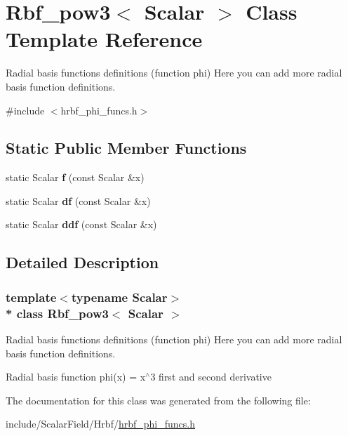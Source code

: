 \hypertarget{structRbf__pow3}{}\section{Rbf\+\_\+pow3$<$ Scalar $>$ Class Template Reference}
\label{structRbf__pow3}


Radial basis functions definitions (function phi) Here you can add more radial basis function definitions.  




{\ttfamily \#include $<$hrbf\+\_\+phi\+\_\+funcs.\+h$>$}

\subsection*{Static Public Member Functions}
\begin{DoxyCompactItemize}
\item 
static Scalar {\bfseries f} (const Scalar \&x)\hypertarget{structRbf__pow3_afcb103387ea85d1efd1b17323896a79e}{}\label{structRbf__pow3_afcb103387ea85d1efd1b17323896a79e}

\item 
static Scalar {\bfseries df} (const Scalar \&x)\hypertarget{structRbf__pow3_a80918c29fab5d70f25f460922af3ef44}{}\label{structRbf__pow3_a80918c29fab5d70f25f460922af3ef44}

\item 
static Scalar {\bfseries ddf} (const Scalar \&x)\hypertarget{structRbf__pow3_af190ed5fb53b24864ddfdafda0ed0217}{}\label{structRbf__pow3_af190ed5fb53b24864ddfdafda0ed0217}

\end{DoxyCompactItemize}


\subsection{Detailed Description}
\subsubsection*{template$<$typename Scalar$>$\\*
class Rbf\+\_\+pow3$<$ Scalar $>$}

Radial basis functions definitions (function phi) Here you can add more radial basis function definitions. 

Radial basis function phi(x) = x$^\wedge$3 first and second derivative 

The documentation for this class was generated from the following file\+:\begin{DoxyCompactItemize}
\item 
include/\+Scalar\+Field/\+Hrbf/\hyperlink{hrbf__phi__funcs_8h}{hrbf\+\_\+phi\+\_\+funcs.\+h}\end{DoxyCompactItemize}
